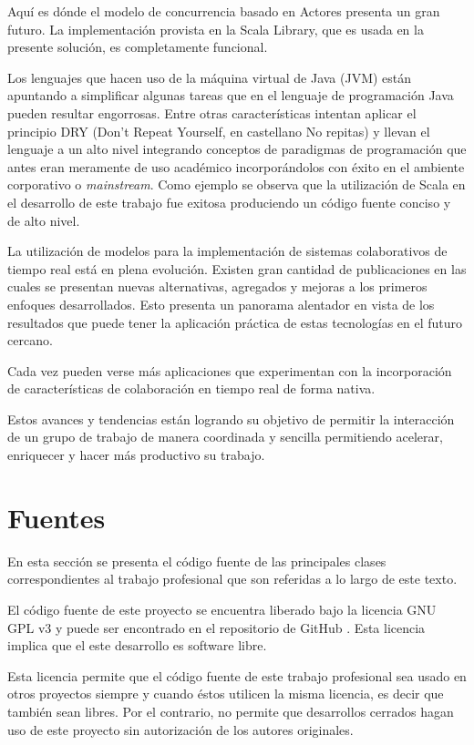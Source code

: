 \documentclass[12pt,a4paper]{article}
\let\stdsection\section
\renewcommand\section{\newpage\stdsection}
\begin{document}
Aquí es dónde el modelo de concurrencia basado en Actores presenta un gran futuro. La implementación provista en la
Scala Library, que es usada en la presente solución, es completamente funcional.

Los lenguajes que hacen uso de la máquina virtual de Java (JVM) están apuntando a simplificar algunas tareas que en el lenguaje
de programación Java pueden resultar engorrosas. Entre otras características intentan aplicar el principio DRY (Don't Repeat
Yourself, en castellano No repitas) y llevan el lenguaje a un alto nivel integrando conceptos de paradigmas de 
programación que antes eran meramente de uso académico incorporándolos con éxito en el ambiente corporativo o \textit{mainstream}.
Como ejemplo se observa que la utilización de Scala en el desarrollo de este trabajo fue exitosa produciendo un código fuente
conciso y de alto nivel.

La utilización de modelos para la implementación de sistemas colaborativos de tiempo real está en plena evolución.
Existen gran cantidad de publicaciones en las cuales se presentan nuevas alternativas, agregados y mejoras a los
primeros enfoques desarrollados. Esto presenta un panorama alentador en vista de los resultados que puede tener la aplicación práctica
de estas tecnologías en el futuro cercano.

Cada vez pueden verse más aplicaciones que experimentan con la incorporación de características de colaboración en tiempo real de
forma nativa.

Estos avances y tendencias están logrando su objetivo de permitir la interacción de un grupo de trabajo de manera coordinada y
sencilla permitiendo acelerar, enriquecer y hacer más productivo su trabajo.

\section{Fuentes}

En esta sección se presenta el código fuente de las principales clases correspondientes al trabajo profesional que
son referidas a lo largo de este texto.

El código fuente de este proyecto se encuentra liberado bajo la licencia GNU GPL v3 \cite{gpl} y puede ser encontrado
en el repositorio de GitHub \cite{github}. Esta licencia implica que el este desarrollo es software libre.

Esta licencia permite que el código fuente de este trabajo profesional sea usado en otros proyectos siempre y cuando
éstos utilicen la misma licencia, es decir que también sean libres. Por el contrario, no permite que desarrollos
cerrados hagan uso de este proyecto sin autorización de los autores originales.
\end{document}
